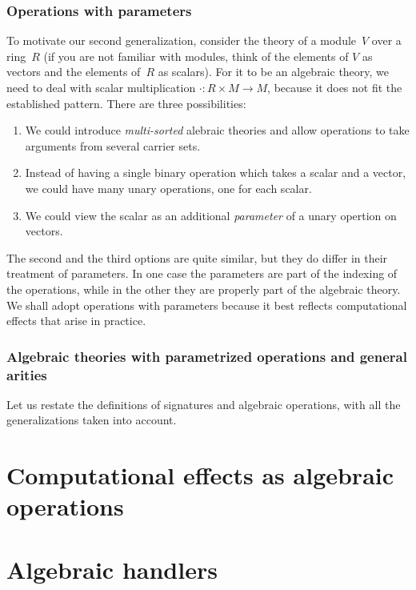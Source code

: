 \documentclass{amsart}
\begin{document}
\subsubsection{Operations with parameters}
\label{sec:oper-with-param}

To motivate our second generalization, consider the theory of a module~$V$ over
a ring~$R$ (if you are not familiar with modules, think of the elements of $V$
as vectors and the elements of~$R$ as scalars). For it to be an algebraic
theory, we need to deal with scalar multiplication ${\cdot} : R \times M \to M$,
because it does not fit the established pattern. There are three possibilities:
%
\begin{enumerate}
\item We could introduce \emph{multi-sorted} alebraic theories and allow
  operations to take arguments from several carrier sets.
\item Instead of having a single binary operation which takes a scalar and a
  vector, we could have many unary operations, one for each scalar.
\item We could view the scalar as an additional \emph{parameter} of a
  unary opertion on vectors.
\end{enumerate}
%
The second and the third options are quite similar, but they do differ in their
treatment of parameters. In one case the parameters are part of the indexing of
the operations, while in the other they are properly part of the algebraic
theory. We shall adopt operations with parameters because it best reflects
computational effects that arise in practice.

\subsubsection{Algebraic theories with parametrized operations and general arities}
\label{sec:algebr-theor-with}

Let us restate the definitions of signatures and algebraic operations, with all
the generalizations taken into account.


\section{Computational effects as algebraic operations}
\label{sec:comp-effects-as}

\section{Algebraic handlers}
\label{sec:algebraic-handlers}
\end{document}
